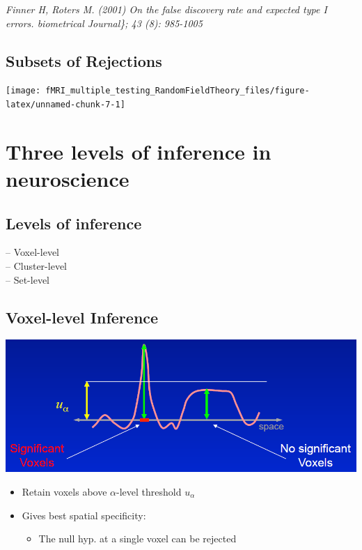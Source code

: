 \documentclass[]{article}
\providecommand{\tightlist}{%
  \setlength{\itemsep}{0pt}\setlength{\parskip}{0pt}}
\begin{document}
\emph{Finner H, Roters M. (2001) On the false discovery rate and
expected type I errors. biometrical Journal\}; 43 (8): 985-1005}

\subsection{Subsets of Rejections}\label{subsets-of-rejections}

\begin{center}\texttt{[image: fMRI\_multiple\_testing\_RandomFieldTheory\_files/figure-latex/unnamed-chunk-7-1]} \end{center}

\section{Three levels of inference in
neuroscience}\label{three-levels-of-inference-in-neuroscience}

\subsection{Levels of inference}\label{levels-of-inference}

-- Voxel-level\\
-- Cluster-level\\
-- Set-level

\subsection{Voxel-level Inference}\label{voxel-level-inference}

\begin{center}\includegraphics[width=700px]{./figs/voxel_level} \end{center}

\begin{itemize}
\tightlist
\item
  Retain voxels above \(\alpha\)-level threshold \(u_\alpha\)
\item
  Gives best spatial specificity:

  \begin{itemize}
  \tightlist
  \item
    The null hyp. at a single voxel can be rejected
  \end{itemize}
\end{itemize}
\end{document}
